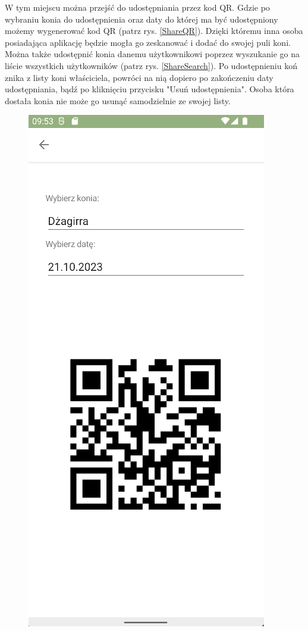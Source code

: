 \documentclass[12pt,oneside]{report}
\begin{document}
 W tym miejscu można przejść do udostępniania przez kod QR. Gdzie po wybraniu konia do udostępnienia oraz daty do której ma być udostępniony możemy wygenerować kod QR (patrz rys. \ref{ShareQR}). Dzięki któremu inna osoba posiadająca aplikację będzie mogła go zeskanować i dodać do swojej puli koni. Można także udostępnić konia danemu użytkownikowi poprzez wyszukanie go na liście wszystkich użytkowników (patrz rys. \ref{ShareSearch}). Po udostępnieniu koń znika z listy koni właściciela, powróci na nią dopiero po zakończeniu daty udostępniania, bądź po kliknięciu przycisku "Usuń udostępnienia". Osoba która dostała konia nie może go usunąć samodzielnie ze swojej listy. 
\begin{figure}[H]
	\begin{center}
		\begin{minipage}{5cm}
			\centering
			\includegraphics[scale=0.6]{ShareQR}

\end{minipage}
\end{center}
\end{figure}
\end{document}
